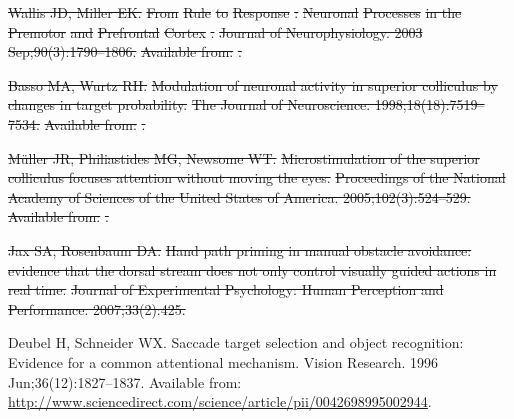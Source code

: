 \documentclass[10pt,letterpaper]{article}
\providecommand{\DIFdeltex}[1]{{\protect\color{red}\sout{#1}}}                      %
\providecommand{\DIFdelend}{} %
\providecommand{\DIFdel}[1]{\texorpdfstring{\DIFdeltex{#1}}{}} %
\begin{document}
\begin{thebibliography}{10}
\DIFdel{Wallis JD, Miller EK.
}%
\DIFdel{From }%
\DIFdel{Rule}%
\DIFdel{to }%
\DIFdel{Response}%
\DIFdel{: }%
\DIFdel{Neuronal}%
\DIFdel{Processes}%
\DIFdel{in the }%
\DIFdel{Premotor}%
\DIFdel{and }%
\DIFdel{Prefrontal}%
\DIFdel{Cortex}%
\DIFdel{.
}%
\DIFdel{Journal of Neurophysiology. 2003 Sep;90(3):1790--1806.
}%
\DIFdel{Available from:
  }%
\DIFdel{.
}%

\DIFdel{Basso MA, Wurtz RH.
}%
\DIFdel{Modulation of neuronal activity in superior colliculus by changes in
  target probability.
}%
\DIFdel{The Journal of Neuroscience. 1998;18(18):7519--7534.
}%
\DIFdel{Available from:
  }%
\DIFdel{.
}%

\DIFdel{Müller JR, Philiastides MG, Newsome WT.
}%
\DIFdel{Microstimulation of the superior colliculus focuses attention without
  moving the eyes.
}%
\DIFdel{Proceedings of the National Academy of Sciences of the United States
  of America. 2005;102(3):524--529.
}%
\DIFdel{Available from: }%
\DIFdel{.
}%

\DIFdel{Jax SA, Rosenbaum DA.
}%
\DIFdel{Hand path priming in manual obstacle avoidance: evidence that the
  dorsal stream does not only control visually guided actions in real time.
}%
\DIFdel{Journal of Experimental Psychology: Human Perception and Performance.
  2007;33(2):425.
}%

\DIFdelend {}
Deubel H, Schneider WX.
\newblock Saccade target selection and object recognition: {Evidence} for a
  common attentional mechanism.
\newblock Vision Research. 1996 Jun;36(12):1827--1837.
\newblock Available from:
  \url{http://www.sciencedirect.com/science/article/pii/0042698995002944}.


\end{thebibliography}
\end{document}
